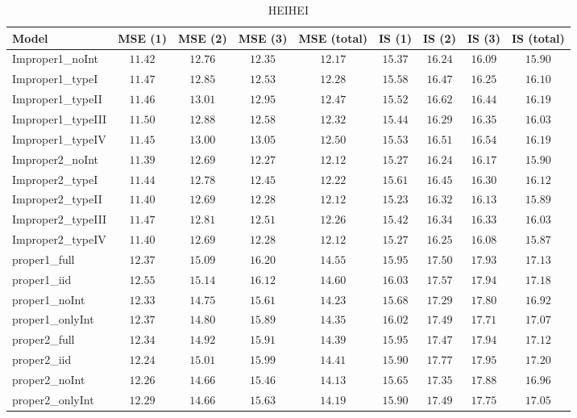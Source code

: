 \begin{table}

\caption{\label{tab:model-choice-sc5}HEIHEI}
\centering
\begin{tabular}{lcccccccc}
\hline
Model  & MSE (1) & MSE (2) & MSE (3) & MSE (total) & IS (1) & IS (2) & IS (3) & \multicolumn{1}{c}{IS (total)} \\ 
\hline
Improper1_noInt  & $11.42$ & $12.76$ & $12.35$ & $12.17$ & $15.37$ & $16.24$ & $16.09$ & $15.90$ \\
Improper1_typeI  & $11.47$ & $12.85$ & $12.53$ & $12.28$ & $15.58$ & $16.47$ & $16.25$ & $16.10$ \\
Improper1_typeII  & $11.46$ & $13.01$ & $12.95$ & $12.47$ & $15.52$ & $16.62$ & $16.44$ & $16.19$ \\
Improper1_typeIII  & $11.50$ & $12.88$ & $12.58$ & $12.32$ & $15.44$ & $16.29$ & $16.35$ & $16.03$ \\
Improper1_typeIV  & $11.45$ & $13.00$ & $13.05$ & $12.50$ & $15.53$ & $16.51$ & $16.54$ & $16.19$ \\
Improper2_noInt  & $11.39$ & $12.69$ & $12.27$ & $12.12$ & $15.27$ & $16.24$ & $16.17$ & $15.90$ \\
Improper2_typeI  & $11.44$ & $12.78$ & $12.45$ & $12.22$ & $15.61$ & $16.45$ & $16.30$ & $16.12$ \\
Improper2_typeII  & $11.40$ & $12.69$ & $12.28$ & $12.12$ & $15.23$ & $16.32$ & $16.13$ & $15.89$ \\
Improper2_typeIII  & $11.47$ & $12.81$ & $12.51$ & $12.26$ & $15.42$ & $16.34$ & $16.33$ & $16.03$ \\
Improper2_typeIV  & $11.40$ & $12.69$ & $12.28$ & $12.12$ & $15.27$ & $16.25$ & $16.08$ & $15.87$ \\
proper1_full  & $12.37$ & $15.09$ & $16.20$ & $14.55$ & $15.95$ & $17.50$ & $17.93$ & $17.13$ \\
proper1_iid  & $12.55$ & $15.14$ & $16.12$ & $14.60$ & $16.03$ & $17.57$ & $17.94$ & $17.18$ \\
proper1_noInt  & $12.33$ & $14.75$ & $15.61$ & $14.23$ & $15.68$ & $17.29$ & $17.80$ & $16.92$ \\
proper1_onlyInt  & $12.37$ & $14.80$ & $15.89$ & $14.35$ & $16.02$ & $17.49$ & $17.71$ & $17.07$ \\
proper2_full  & $12.34$ & $14.92$ & $15.91$ & $14.39$ & $15.95$ & $17.47$ & $17.94$ & $17.12$ \\
proper2_iid  & $12.24$ & $15.01$ & $15.99$ & $14.41$ & $15.90$ & $17.77$ & $17.95$ & $17.20$ \\
proper2_noInt  & $12.26$ & $14.66$ & $15.46$ & $14.13$ & $15.65$ & $17.35$ & $17.88$ & $16.96$ \\
proper2_onlyInt  & $12.29$ & $14.66$ & $15.63$ & $14.19$ & $15.90$ & $17.49$ & $17.75$ & $17.05$ \\
\hline 
\end{tabular}


\end{table}